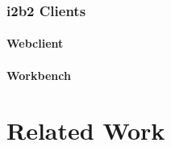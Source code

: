 \subsubsection{i2b2 Clients}
\paragraph{Webclient}

\paragraph{Workbench}

\section{Related Work}


